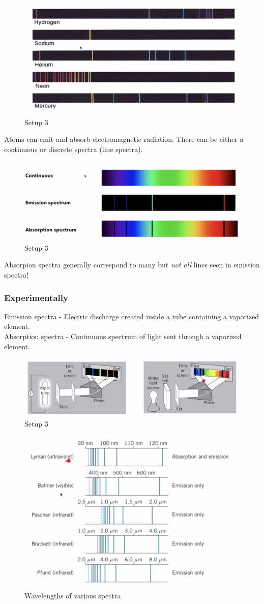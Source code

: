 \documentclass[class=article,crop=false]{standalone}
\begin{document}
\begin{figure}[h!]
	\centering
	\includegraphics[width=.6\linewidth]{./Images/spectrums.png}
	\caption{Setup 3}
\end{figure}
Atoms can emit and absorb electromagnetic radiation. There can be either a continuous or discrete spectra (line spectra).

\begin{figure}[h!]
	\centering
	\includegraphics[width=.6\linewidth]{./Images/emission.png}
	\caption{Setup 3}
\end{figure}
Absorpion spectra generally correspond to many but \emph{not all} lines seen in emission spectra!\\

\subsubsection{Experimentally}
Emission spectra - Electric discharge created inside a tube containing a vaporized element.\\
Absorption spectra - Continuous spectrum of light sent through a vaporized element.
\begin{figure}[h!]
	\centering
	\includegraphics[width=.7\linewidth]{./Images/em_abs.png}
	\caption{Setup 3}
\end{figure}

\begin{figure}[h]
	\centering
	\includegraphics[width=.7\linewidth]{./Images/em_only.png}
	\caption{Wavelengths of various spectra}
\end{figure}
\end{document}
